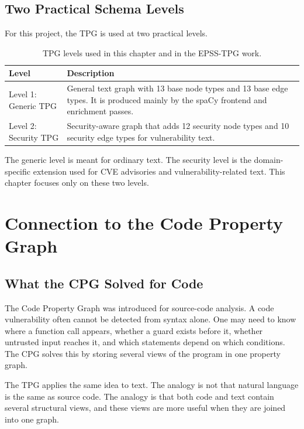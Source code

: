 \documentclass[11pt]{article}
\begin{document}
\subsection{Two Practical Schema Levels}

For this project, the TPG is used at two practical levels.

\begin{table}[h]
\centering
\small
\begin{tabular}{lp{}}
\toprule
Level & Description \\
\midrule
Level 1: Generic TPG & General text graph with 13 base node types and 13 base edge types. It is produced mainly by the spaCy frontend and enrichment passes. \\
Level 2: Security TPG & Security-aware graph that adds 12 security node types and 10 security edge types for vulnerability text. \\
\bottomrule
\end{tabular}
\caption{TPG levels used in this chapter and in the EPSS-TPG work.}
\end{table}

The generic level is meant for ordinary text. The security level is the
domain-specific extension used for CVE advisories and vulnerability-related
text. This chapter focuses only on these two levels.

\section{Connection to the Code Property Graph}

\subsection{What the CPG Solved for Code}

The Code Property Graph was introduced for source-code analysis. A code
vulnerability often cannot be detected from syntax alone. One may need to know
where a function call appears, whether a guard exists before it, whether
untrusted input reaches it, and which statements depend on which conditions.
The CPG solves this by storing several views of the program in one property
graph.

The TPG applies the same idea to text. The analogy is not that natural language
is the same as source code. The analogy is that both code and text contain
several structural views, and these views are more useful when they are joined
into one graph.
\end{document}
